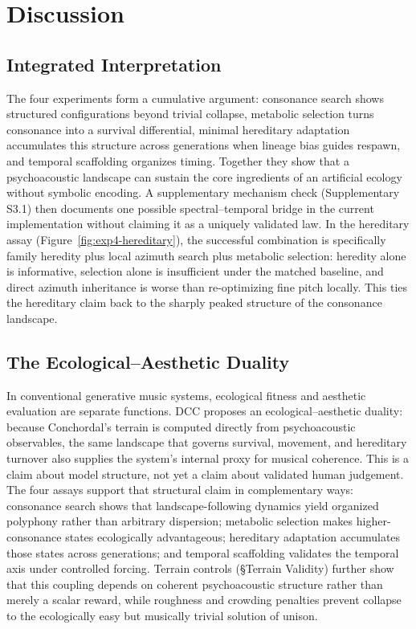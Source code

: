 \documentclass[letterpaper]{article}
\begin{document}
\section{Discussion}

\subsection{Integrated Interpretation}

The four experiments form a cumulative argument: consonance search shows structured configurations beyond trivial collapse, metabolic selection turns consonance into a survival differential, minimal hereditary adaptation accumulates this structure across generations when lineage bias guides respawn, and temporal scaffolding organizes timing. Together they show that a psychoacoustic landscape can sustain the core ingredients of an artificial ecology without symbolic encoding. A supplementary mechanism check (Supplementary S3.1) then documents one possible spectral--temporal bridge in the current implementation without claiming it as a uniquely validated law. In the hereditary assay (Figure~\ref{fig:exp4-hereditary}), the successful combination is specifically family heredity plus local azimuth search plus metabolic selection: heredity alone is informative, selection alone is insufficient under the matched baseline, and direct azimuth inheritance is worse than re-optimizing fine pitch locally. This ties the hereditary claim back to the sharply peaked structure of the consonance landscape.

\subsection{The Ecological--Aesthetic Duality}

In conventional generative music systems, ecological fitness and aesthetic evaluation are separate functions. DCC proposes an ecological--aesthetic duality: because Conchordal's terrain is computed directly from psychoacoustic observables, the same landscape that governs survival, movement, and hereditary turnover also supplies the system's internal proxy for musical coherence. This is a claim about model structure, not yet a claim about validated human judgement. The four assays support that structural claim in complementary ways: consonance search shows that landscape-following dynamics yield organized polyphony rather than arbitrary dispersion; metabolic selection makes higher-consonance states ecologically advantageous; hereditary adaptation accumulates those states across generations; and temporal scaffolding validates the temporal axis under controlled forcing. Terrain controls (\S Terrain Validity) further show that this coupling depends on coherent psychoacoustic structure rather than merely a scalar reward, while roughness and crowding penalties prevent collapse to the ecologically easy but musically trivial solution of unison.
\end{document}
